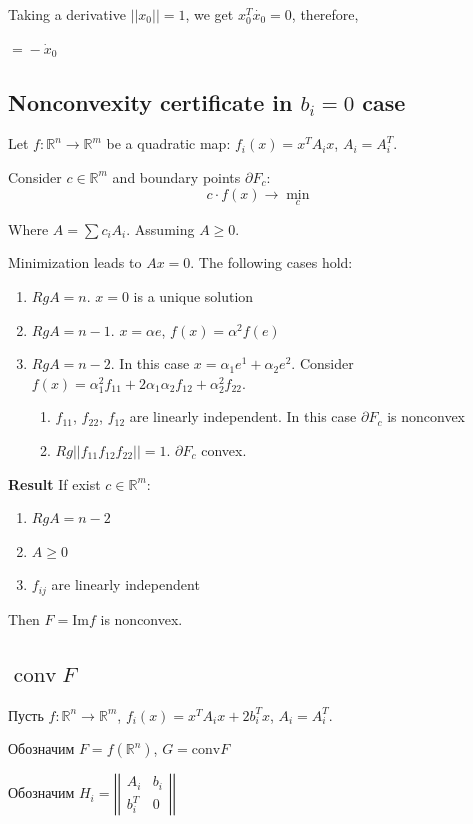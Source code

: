\documentclass[a4paper]{article}
\DeclareMathOperator{\conv}{conv}
\begin{document}
Taking a derivative $||x_0||=1$, we get $x_0^T\dot{x_0}=0$, therefore,

$\boxed{=}-\dot{x}_0$

\subsection{Nonconvexity certificate in $b_i=0$ case}

Let $f\colon \mathbb{R}^n\to\mathbb{R}^m$ be a quadratic map: $f_i(x)=x^TA_ix$, $A_i=A_i^T$.

Consider $c\in\mathbb{R}^m$ and boundary points $\partial F_c$:
$$c\cdot f(x)\to \min\limits_c$$

Where $A=\sum c_iA_i$. Assuming $A\geqslant 0$.

Minimization leads to $Ax=0$. The following cases hold:
\begin{enumerate}
	\item $RgA=n$. $x=0$ is a unique solution
	\item $RgA=n-1$. $x=\alpha e$, $f(x)=\alpha^2 f(e)$
	\item $RgA=n-2$. In this case $x=\alpha_1 e^1+\alpha_2 e^2$. Consider $f(x)=\alpha_1^2 f_{11}+2\alpha_1\alpha_2f_{12}+\alpha_2^2f_{22}$.
	\begin{enumerate}
		\item $f_{11}$, $f_{22}$, $f_{12}$ are linearly independent. In this case $\partial F_c$ is nonconvex
		\item $Rg ||f_{11} f_{12} f_{22}||=1$. $\partial F_c$ convex.
	\end{enumerate}
\end{enumerate}


{\bf Result}
If exist $c\in\mathbb{R}^m$:
\begin{enumerate}
	\item $RgA=n-2$
	\item $A\geqslant 0$
	\item $f_{ij}$ are linearly independent
\end{enumerate}
Then $F=\mbox{Im}f$ is nonconvex.

\subsection{$\conv F$}
Пусть $f\colon \mathbb{R}^n\to\mathbb{R}^m$, $f_i(x)=x^TA_ix+2b_i^Tx$, $A_i=A_i^T$.

Обозначим $F=f(\mathbb{R}^n)$, $G=\mbox{conv}F$

Обозначим $H_i=\left|\left|
\begin{array}{cc}
A_i & b_i\\
b_i^T & 0
\end{array}
\right|\right|$
\end{document}
